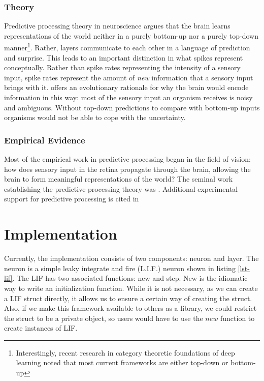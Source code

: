 \documentclass[12pt,english]{article}
\begin{document}
\subsubsection{Theory}
Predictive processing theory in neuroscience argues that the brain learns representations of the world neither in a purely bottom-up nor a purely top-down manner\footnote{Interestingly, recent research in category theoretic foundations of deep learning noted that most current frameworks are either top-down or bottom-up\cite{}}. Rather, layers communicate to each other in a language of prediction and surprise. This leads to an important distinction in what spikes represent conceptually. Rather than spike rates representing the intensity of a sensory input, spike rates represent the amount of \textit{new} information that a sensory input brings with it. \cite{Clark15} offers an evolutionary rationale for why the brain would encode information in this way: most of the sensory input an organism receives is noisy and ambiguous. Without top-down predictions to compare with bottom-up inputs organisms would not be able to cope with the uncertainty. 



\subsubsection{Empirical Evidence}
Most of the empirical work in predictive processing began in the field of vision: how does sensory input in the retina propagate through the brain, allowing the brain to form meaningful representations of the world? The seminal work establishing the predictive processing theory was \cite{RaoBallard99}. Additional experimental support for predictive processing is cited in \cite{Millidge22, Bastos12}
\section{Implementation}

Currently, the implementation consists of two components: neuron and layer.
The neuron is a simple leaky integrate and fire (L.I.F.) neuron shown in listing \ref{lst-lif}.
The LIF has two associated functions: new and step.
New is the idiomatic way to write an initialization function.
While it is not necessary, as we can create a LIF struct directly, it allows us to ensure a certain way of creating the struct.
Also, if we make this framework available to others as a library, we could restrict the struct to be a private object, so users would have to use the $new$ function to create instances of LIF.
\end{document}
